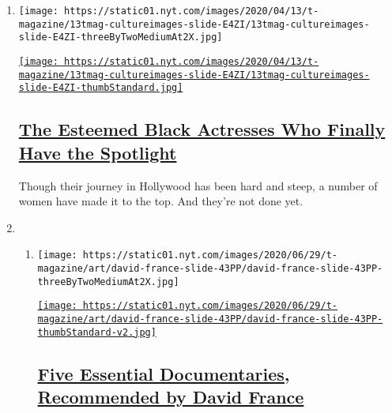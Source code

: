 \begin{enumerate}
\def\labelenumi{\arabic{enumi}.}
\item
  \texttt{[image: https://static01.nyt.com/images/2020/04/13/t-magazine/13tmag-cultureimages-slide-E4ZI/13tmag-cultureimages-slide-E4ZI-threeByTwoMediumAt2X.jpg]}

  \href{/interactive/2020/04/13/t-magazine/black-actresses-bassett-berry-blige-henson-whitfield-elise.html}{\texttt{[image: https://static01.nyt.com/images/2020/04/13/t-magazine/13tmag-cultureimages-slide-E4ZI/13tmag-cultureimages-slide-E4ZI-thumbStandard.jpg]}}

  \hypertarget{the-esteemed-black-actresses-who-finally-have-the-spotlight}{%
  \subsection{\texorpdfstring{\href{/interactive/2020/04/13/t-magazine/black-actresses-bassett-berry-blige-henson-whitfield-elise.html}{The
  Esteemed Black Actresses Who Finally Have the
  Spotlight}}{The Esteemed Black Actresses Who Finally Have the Spotlight}}\label{the-esteemed-black-actresses-who-finally-have-the-spotlight}}

  Though their journey in Hollywood has been hard and steep, a number of
  women have made it to the top. And they're not done yet.
\item
  \begin{enumerate}
  \def\labelenumii{\arabic{enumii}.}
  \item
    \texttt{[image: https://static01.nyt.com/images/2020/06/29/t-magazine/art/david-france-slide-43PP/david-france-slide-43PP-threeByTwoMediumAt2X.jpg]}

    \href{/2020/06/29/t-magazine/david-france-documentary-watch-list.html}{\texttt{[image: https://static01.nyt.com/images/2020/06/29/t-magazine/art/david-france-slide-43PP/david-france-slide-43PP-thumbStandard-v2.jpg]}}

    \hypertarget{five-essential-documentaries-recommended-by-david-france}{%
    \subsection{\texorpdfstring{\href{/2020/06/29/t-magazine/david-france-documentary-watch-list.html}{Five
    Essential Documentaries, Recommended by David
    France}}{Five Essential Documentaries, Recommended by David France}}\label{five-essential-documentaries-recommended-by-david-france}}


\end{enumerate}
\end{enumerate}
